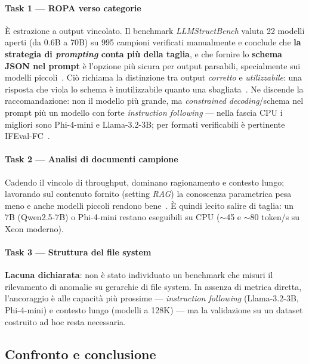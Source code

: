 \paragraph*{Task 1 --- ROPA verso categorie} È estrazione a output vincolato. Il benchmark \textit{LLMStructBench} valuta 22 modelli aperti (da 0.6B a 70B) su 995 campioni verificati manualmente e conclude che \textbf{la strategia di \textit{prompting} conta più della taglia}, e che fornire lo \textbf{schema JSON nel prompt} è l'opzione più sicura per output parsabili, specialmente sui modelli piccoli~\cite{tenckhoff2026llmstructbench}. Ciò richiama la distinzione tra output \textit{corretto} e \textit{utilizzabile}: una risposta che viola lo schema è inutilizzabile quanto una sbagliata~\cite{structuredreliability2026}. Ne discende la raccomandazione: non il modello più grande, ma \textit{constrained decoding}/schema nel prompt più un modello con forte \textit{instruction following} --- nella fascia CPU i migliori sono Phi-4-mini e Llama-3.2-3B; per formati verificabili è pertinente IFEval-FC~\cite{skripko2025ifevalfc}.

\paragraph*{Task 2 --- Analisi di documenti campione} Cadendo il vincolo di throughput, dominano ragionamento e contesto lungo; lavorando sul contenuto fornito (setting \textit{RAG}) la conoscenza parametrica pesa meno e anche modelli piccoli rendono bene~\cite{malakhov2026cpullm}. È quindi lecito salire di taglia: un 7B (Qwen2.5-7B) o Phi-4-mini restano eseguibili su CPU ($\sim$45 e $\sim$80 token/s su Xeon moderno).

\paragraph*{Task 3 --- Struttura del file system} \textbf{Lacuna dichiarata}: non è stato individuato un benchmark che misuri il rilevamento di anomalie su gerarchie di file system. In assenza di metrica diretta, l'ancoraggio è alle capacità più prossime --- \textit{instruction following} (Llama-3.2-3B, Phi-4-mini) e contesto lungo (modelli a 128K) --- ma la validazione su un dataset costruito ad hoc resta necessaria.

\subsection{Confronto e conclusione}
\label{sub:slm-conclusione}

